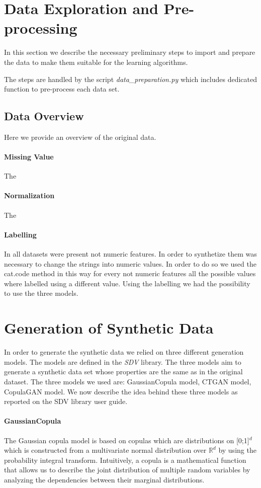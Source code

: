 \documentclass{article}
\begin{document}
\section{Data Exploration and Pre-processing}
In this section we describe the necessary preliminary steps to import and prepare the data to make them suitable for the learning algorithms.

The steps are handled by the script \textit{data\_preparation.py} which includes dedicated function to pre-process each data set.

\subsection{Data Overview}
Here we provide an overview of the original data.

\paragraph{Missing Value}
The
\paragraph{Normalization}
The
\paragraph{Labelling}
In all datasets were present not numeric features. In order to synthetize them was necessary to change the strings into numeric values. In order to do so we used the cat.code method in this way for every not numeric features all the possible values where labelled using a different value. Using the labelling we had the possibility to use the three models.

\section{Generation of Synthetic Data} \label{sec::synthetic}
In order to generate the synthetic data we relied on three different generation models. The models are defined in the \textit{SDV} library. The three models aim to generate a synthetic data set whose properties are the same as in the original dataset. The three models we used are: GaussianCopula model, CTGAN model, CopulaGAN model.
We now describe the idea behind these three models as reported on the SDV library user guide.

\paragraph{GaussianCopula}
The Gaussian copula model \cite{gaussiancopula} is based on copulas which are distributions on [0;1]$^d$ which is constructed from a multivariate normal distribution over $\mathbb{R}^d$ by using the probability integral transform. Intuitively, a copula is a mathematical function that allows us to describe the joint distribution of multiple random variables by analyzing the dependencies between their marginal distributions.
\end{document}
